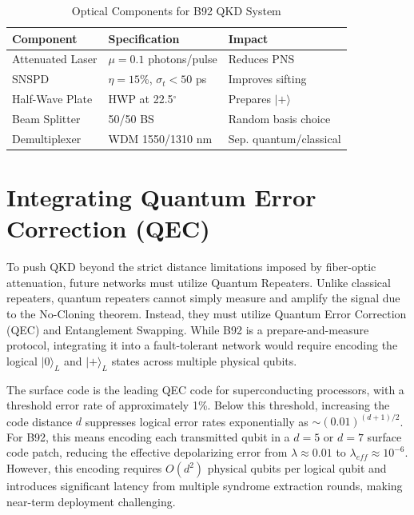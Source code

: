 \documentclass[conference]{IEEEtran}
\begin{document}
\begin{table}[htbp]
\caption{Optical Components for B92 QKD System}
\label{tab:optical}
\centering
\small
\begin{tabular}{lll}
\toprule
\textbf{Component} & \textbf{Specification} & \textbf{Impact} \\
\midrule
Attenuated Laser & $\mu = 0.1$ photons/pulse & Reduces PNS \\
SNSPD & $\eta=15$\%, $\sigma_t\!<\!50$ ps & Improves sifting \\
Half-Wave Plate & HWP at 22.5$^\circ$ & Prepares $|+\rangle$ \\
Beam Splitter & 50/50 BS & Random basis choice \\
Demultiplexer & WDM 1550/1310 nm & Sep. quantum/classical \\
\bottomrule
\end{tabular}
\end{table}

\section{Integrating Quantum Error Correction (QEC)}\label{sec:qec}
To push QKD beyond the strict distance limitations imposed by fiber-optic attenuation, future networks must utilize Quantum Repeaters. Unlike classical repeaters, quantum repeaters cannot simply measure and amplify the signal due to the No-Cloning theorem. Instead, they must utilize Quantum Error Correction (QEC) and Entanglement Swapping. While B92 is a prepare-and-measure protocol, integrating it into a fault-tolerant network would require encoding the logical $|0\rangle_L$ and $|+\rangle_L$ states across multiple physical qubits.

The surface code \cite{fowler2012surface} is the leading QEC code for superconducting processors, with a threshold error rate of approximately 1\%. Below this threshold, increasing the code distance $d$ suppresses logical error rates exponentially as $\sim (0.01)^{(d+1)/2}$. For B92, this means encoding each transmitted qubit in a $d=5$ or $d=7$ surface code patch, reducing the effective depolarizing error from $\lambda \approx 0.01$ to $\lambda_{eff} \approx 10^{-6}$. However, this encoding requires $O(d^2)$ physical qubits per logical qubit and introduces significant latency from multiple syndrome extraction rounds, making near-term deployment challenging.
\end{document}
